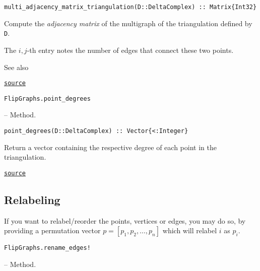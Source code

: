 \begin{adjustwidth}{2em}{0pt}


\begin{verbatim}
multi_adjacency_matrix_triangulation(D::DeltaComplex) :: Matrix{Int32}
\end{verbatim}

Compute the \emph{adjacency matrix} of the multigraph of the triangulation defined by \texttt{D}.

The \(i,j\)-th entry notes the number of edges that connect these two points.

See also 



\href{https://github.com/schto223/FlipGraphs.jl/blob/490c01a7adf74b42f27dda05099165c47ae8133e/src/deltaComplex.jl#L464-L472}{\texttt{source}}


\end{adjustwidth}
\hypertarget{12112898979774677454}{\texttt{FlipGraphs.point\_degrees}}  -- {Method.}

\begin{adjustwidth}{2em}{0pt}


\begin{verbatim}
point_degrees(D::DeltaComplex) :: Vector{<:Integer}
\end{verbatim}

Return a vector containing the respective degree of each point in the triangulation.



\href{https://github.com/schto223/FlipGraphs.jl/blob/490c01a7adf74b42f27dda05099165c47ae8133e/src/deltaComplex.jl#L1091-L1095}{\texttt{source}}


\end{adjustwidth}

\subsection{Relabeling}



\label{13834926465878219209}{}


If you want to relabel/reorder the points, vertices or edges, you may do so, by providing a permutation vector \(p=[p_1, p_2, \ldots , p_n]\) which will relabel \(i\) as \(p_i\). 


\hypertarget{17900291854214806966}{\texttt{FlipGraphs.rename\_edges!}}  -- {Method.}

